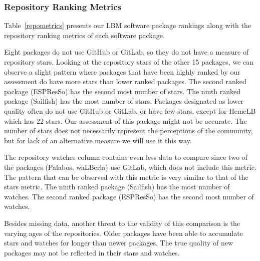 \documentclass[final, 3p, times, authoryear]{elsarticle}
\begin{document}
\subsubsection{Repository Ranking Metrics} \label{repmetrics}

Table~\ref{repometrics} presents our LBM software package rankings along with
the repository ranking metrics of each software package. 

Eight packages do not use GitHub or GitLab, so they do not have a measure of
repository stars. Looking at the repository stars of the other 15 packages, we
can observe a slight pattern where packages that have been highly ranked by our
assessment do have more stars than lower ranked packages. The second ranked
package (ESPResSo) has the second most number of stars. The ninth ranked package
(Sailfish) has the most number of stars. Packages designated as lower quality
often do not use GitHub or GitLab, or have few stars, except for HemeLB which
has 22 stars. Our assessment of this package might not be accurate. The number
of stars does not necessarily represent the perceptions of the community, but
for lack of an alternative measure we will use it this way. 

The repository watches column contains even less data to compare since two of
the packages (Palabos, waLBerla) use GitLab, which does not include this metric.
The pattern that can be observed with this metric is very similar to that of the
stars metric. The ninth ranked package (Sailfish) has the most number of
watches. The second ranked package (ESPResSo) has the second most number of
watches.

Besides missing data, another threat to the validity of this comparison is the
varying ages of the repositories. Older packages have been able to accumulate
stars and watches for longer than newer packages. The true quality of new
packages may not be reflected in their stars and watches. \\
\end{document}
